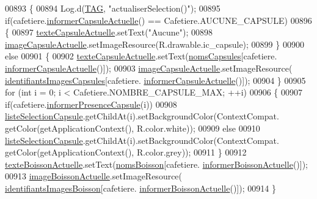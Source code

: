 \begin{DoxyCode}
00893     \{
00894         Log.d(\hyperlink{classcom_1_1example_1_1ekawa_1_1_ihm_a95cd92c2acaf9f8982302da08d94f9aa}{TAG}, \textcolor{stringliteral}{"actualiserSelection()"});
00895         \textcolor{keywordflow}{if}(cafetiere.\hyperlink{classcom_1_1example_1_1ekawa_1_1_cafetiere_a3251d1865f3a4113553e1743a971984d}{informerCapsuleActuelle}() == Cafetiere.AUCUNE\_CAPSULE)
00896         \{
00897             \hyperlink{classcom_1_1example_1_1ekawa_1_1_ihm_a3a9c8a185607e09fed0df62e46925786}{texteCapsuleActuelle}.setText(\textcolor{stringliteral}{"Aucune"});
00898             \hyperlink{classcom_1_1example_1_1ekawa_1_1_ihm_a82418c4769be80ea67628e2ae8e85ee4}{imageCapsuleActuelle}.setImageResource(R.drawable.ic\_capsule);
00899         \}
00900         \textcolor{keywordflow}{else}
00901         \{
00902             \hyperlink{classcom_1_1example_1_1ekawa_1_1_ihm_a3a9c8a185607e09fed0df62e46925786}{texteCapsuleActuelle}.setText(\hyperlink{classcom_1_1example_1_1ekawa_1_1_ihm_a9d61b7bfd998d449bb405dcf5e6e4e89}{nomsCapsules}[cafetiere.
      \hyperlink{classcom_1_1example_1_1ekawa_1_1_cafetiere_a3251d1865f3a4113553e1743a971984d}{informerCapsuleActuelle}()]);
00903             \hyperlink{classcom_1_1example_1_1ekawa_1_1_ihm_a82418c4769be80ea67628e2ae8e85ee4}{imageCapsuleActuelle}.setImageResource(
      \hyperlink{classcom_1_1example_1_1ekawa_1_1_ihm_af35b42764d9f7b10c8bc0e210c3ba76d}{identifiantsImagesCapsules}[cafetiere.
      \hyperlink{classcom_1_1example_1_1ekawa_1_1_cafetiere_a3251d1865f3a4113553e1743a971984d}{informerCapsuleActuelle}()]);
00904         \}
00905         \textcolor{keywordflow}{for} (\textcolor{keywordtype}{int} i = 0; i < Cafetiere.NOMBRE\_CAPSULE\_MAX; ++i)
00906         \{
00907             \textcolor{keywordflow}{if}(cafetiere.\hyperlink{classcom_1_1example_1_1ekawa_1_1_cafetiere_a35a291f849346b374f63324bc3ecd70b}{informerPresenceCapsule}(i))
00908                 \hyperlink{classcom_1_1example_1_1ekawa_1_1_ihm_a0842447d70bca2098431fa532c1c94e8}{listeSelectionCapsule}.getChildAt(i).setBackgroundColor(ContextCompat.
      getColor(getApplicationContext(), R.color.white));
00909             \textcolor{keywordflow}{else}
00910                 \hyperlink{classcom_1_1example_1_1ekawa_1_1_ihm_a0842447d70bca2098431fa532c1c94e8}{listeSelectionCapsule}.getChildAt(i).setBackgroundColor(ContextCompat.
      getColor(getApplicationContext(), R.color.grey));
00911         \}
00912         \hyperlink{classcom_1_1example_1_1ekawa_1_1_ihm_a6655fee013d48228f2c7981f1cd8f74e}{texteBoissonActuelle}.setText(\hyperlink{classcom_1_1example_1_1ekawa_1_1_ihm_abafa700d1d1f943bd3e9678f698ed33a}{nomsBoisson}[cafetiere.
      \hyperlink{classcom_1_1example_1_1ekawa_1_1_cafetiere_aa7022512d5a36d2b911722ae6400379f}{informerBoissonActuelle}()]);
00913         \hyperlink{classcom_1_1example_1_1ekawa_1_1_ihm_a2d83809a52b5f9a97f7817ae183c456d}{imageBoissonActuelle}.setImageResource(
      \hyperlink{classcom_1_1example_1_1ekawa_1_1_ihm_aab3ed36de15018dd29af2df4b3e150e4}{identifiantsImagesBoisson}[cafetiere.
      \hyperlink{classcom_1_1example_1_1ekawa_1_1_cafetiere_aa7022512d5a36d2b911722ae6400379f}{informerBoissonActuelle}()]);
00914     \}
\end{DoxyCode}
